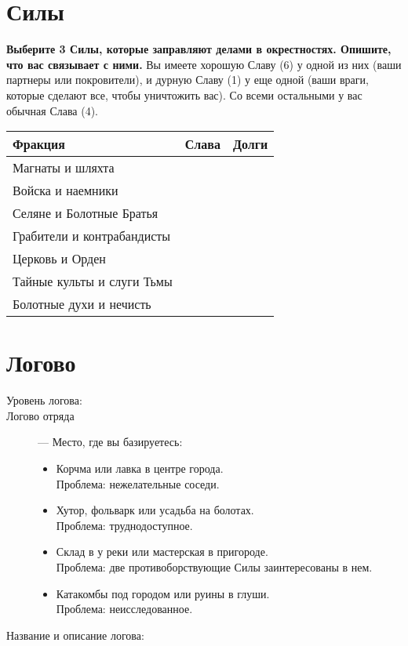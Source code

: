 \documentclass[10pt,twoside]{report}
\begin{document}
\section*{Силы}
{\bfseries Выберите 3 Силы, которые заправляют делами в
  окрестностях. Опишите, что вас связывает с ними.} Вы имеете хорошую
Славу (6) у одной из них (ваши партнеры или покровители), и дурную
Славу (1) у еще одной (ваши враги, которые сделают все, чтобы
уничтожить вас). Со всеми остальными у вас обычная Слава (4).

\vfill
\begin{tabular}{l l l}
  Фракция & Слава & Долги \\
  \hline
  Магнаты и шляхта & & \\
  Войска и наемники & & \\
  Селяне и Болотные Братья & & \\
  Грабители и контрабандисты & & \\
  Церковь и Орден & & \\
  Тайные культы и слуги Тьмы & & \\
  Болотные духи и нечисть & & \\ 
\end{tabular}
\vfill
\pagebreak

\section*{Логово}
\begin{description}
\item[Уровень логова:]
\item[Логово отряда]--- Место, где вы базируетесь:
  
  \begin{itemize}
    \item Корчма или лавка в центре города.\\ Проблема: нежелательные соседи.
    \item Хутор, фольварк или усадьба на болотах.\\ Проблема: труднодоступное.
    \item Склад в у реки или мастерская в пригороде.\\ Проблема: две
      противоборствующие Силы заинтересованы в нем.
    \item Катакомбы под городом или руины в глуши.\\ Проблема: неисследованное. 
    \end{itemize}
\item[Название и описание логова:] 
\end{description}
\end{document}
